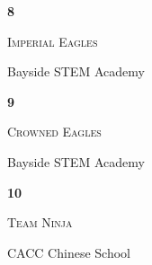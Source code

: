 \documentclass[extrafontsizes,30pt]{memoir}
\begin{document}
\newpage



\renewcommand{\TeamID}{8}
\renewcommand{\TeamName}{Imperial Eagles}
\renewcommand{\SchoolName}{Bayside STEM Academy}

\begin{center}
\mbox{}
\vspace{1in}

{\Huge \textbf{ \TeamID}}

\vspace{1in}

{\Large \textsc{\TeamName}}

\vspace{1in}

{\large \SchoolName}
\end{center}

\newpage



\renewcommand{\TeamID}{9}
\renewcommand{\TeamName}{Crowned Eagles}
\renewcommand{\SchoolName}{Bayside STEM Academy}

\begin{center}
\mbox{}
\vspace{1in}

{\Huge \textbf{ \TeamID}}

\vspace{1in}

{\Large \textsc{\TeamName}}

\vspace{1in}

{\large \SchoolName}
\end{center}

\newpage



\renewcommand{\TeamID}{10}
\renewcommand{\TeamName}{Team Ninja}
\renewcommand{\SchoolName}{CACC Chinese School}

\begin{center}
\mbox{}
\vspace{1in}

{\Huge \textbf{ \TeamID}}

\vspace{1in}

{\Large \textsc{\TeamName}}

\vspace{1in}

{\large \SchoolName}
\end{center}

\newpage
\end{document}
